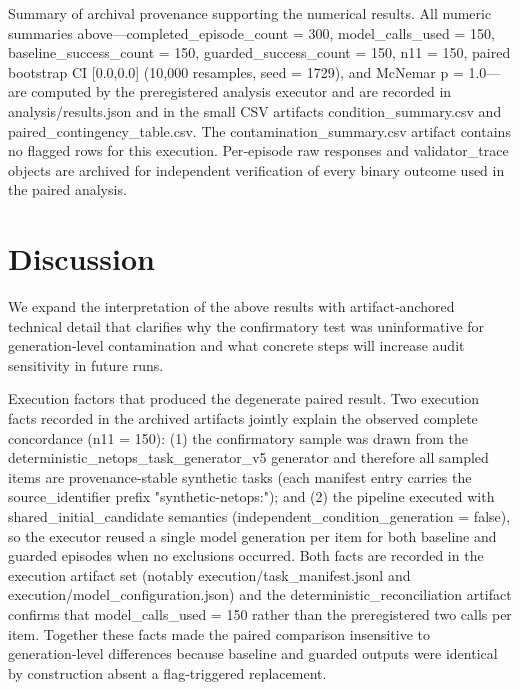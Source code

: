 \documentclass[conference]{IEEEtran}
\begin{document}
Summary of archival provenance supporting the numerical results. All numeric summaries above---completed\_episode\_count = 300, model\_calls\_used = 150, baseline\_success\_count = 150, guarded\_success\_count = 150, n11 = 150, paired bootstrap CI [0.0,0.0] (10,000 resamples, seed = 1729), and McNemar p = 1.0---are computed by the preregistered analysis executor and are recorded in analysis/results.json and in the small CSV artifacts condition\_summary.csv and paired\_contingency\_table.csv. The contamination\_summary.csv artifact contains no flagged rows for this execution. Per‑episode raw responses and validator\_trace objects are archived for independent verification of every binary outcome used in the paired analysis.

\section{Discussion}
We expand the interpretation of the above results with artifact‑anchored technical detail that clarifies why the confirmatory test was uninformative for generation‑level contamination and what concrete steps will increase audit sensitivity in future runs.

Execution factors that produced the degenerate paired result. Two execution facts recorded in the archived artifacts jointly explain the observed complete concordance (n11 = 150): (1) the confirmatory sample was drawn from the deterministic\_netops\_task\_generator\_v5 generator and therefore all sampled items are provenance‑stable synthetic tasks (each manifest entry carries the source\_identifier prefix "synthetic-netops:"); and (2) the pipeline executed with shared\_initial\_candidate semantics (independent\_condition\_generation = false), so the executor reused a single model generation per item for both baseline and guarded episodes when no exclusions occurred. Both facts are recorded in the execution artifact set (notably execution/task\_manifest.jsonl and execution/model\_configuration.json) and the deterministic\_reconciliation artifact confirms that model\_calls\_used = 150 rather than the preregistered two calls per item. Together these facts made the paired comparison insensitive to generation‑level differences because baseline and guarded outputs were identical by construction absent a flag-triggered replacement.
\end{document}
